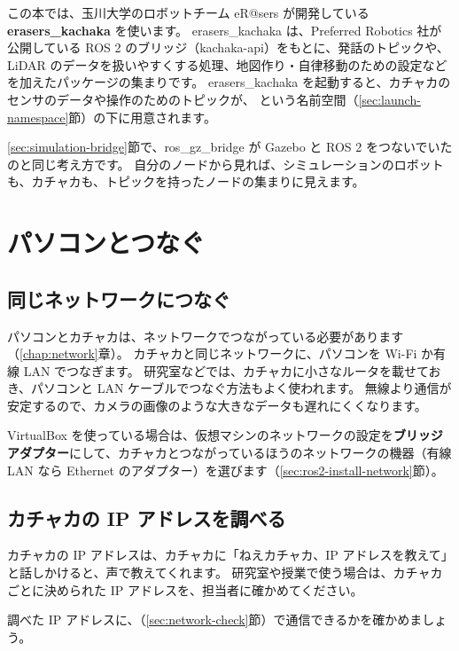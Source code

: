 この本では、玉川大学のロボットチーム eR@sers が開発している \textbf{erasers\_kachaka} を使います。
erasers\_kachaka は、Preferred Robotics 社が公開している ROS 2 のブリッジ（kachaka-api）をもとに、発話のトピックや、LiDAR のデータを扱いやすくする処理、地図作り・自律移動のための設定などを加えたパッケージの集まりです。
erasers\_kachaka を起動すると、カチャカのセンサのデータや操作のためのトピックが、 という名前空間（\ref{sec:launch-namespace}節）の下に用意されます。

\ref{sec:simulation-bridge}節で、ros\_gz\_bridge が Gazebo と ROS 2 をつないでいたのと同じ考え方です。
自分のノードから見れば、シミュレーションのロボットも、カチャカも、トピックを持ったノードの集まりに見えます。

\section{パソコンとつなぐ}
\label{sec:kachaka-connect}

\subsection{同じネットワークにつなぐ}

パソコンとカチャカは、ネットワークでつながっている必要があります（\ref{chap:network}章）。
カチャカと同じネットワークに、パソコンを Wi-Fi か有線 LAN でつなぎます。
研究室などでは、カチャカに小さなルータを載せておき、パソコンと LAN ケーブルでつなぐ方法もよく使われます。
無線より通信が安定するので、カメラの画像のような大きなデータも遅れにくくなります。

VirtualBox を使っている場合は、仮想マシンのネットワークの設定を\textbf{ブリッジアダプター}にして、カチャカとつながっているほうのネットワークの機器（有線 LAN なら Ethernet のアダプター）を選びます（\ref{sec:ros2-install-network}節）。

\subsection{カチャカの IP アドレスを調べる}

カチャカの IP アドレスは、カチャカに「ねえカチャカ、IP アドレスを教えて」と話しかけると、声で教えてくれます。
研究室や授業で使う場合は、カチャカごとに決められた IP アドレスを、担当者に確かめてください。

調べた IP アドレスに、（\ref{sec:network-check}節）で通信できるかを確かめましょう。


